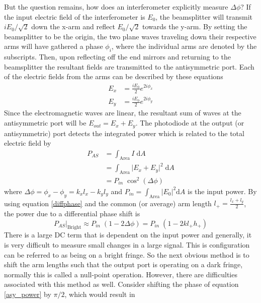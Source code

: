 		But the question remains, how does an interferometer explicitly measure $\Delta \phi$?  If the input electric field of the interferometer is $E_0$, the beamsplitter will transmit $iE_0 /\sqrt{2}$ down the x-arm and reflect $E_0 /\sqrt{2}$ towards the y-arm.  By setting the beamsplitter to be the origin, the two plane waves traveling down their respective arms will have gathered a phase $\phi_i$, where the individual arms are denoted by the subscripts. Then, upon reflecting off the end mirrors and returning to the beamsplitter the resultant fields are transmitted to the antisymmetric port. Each of the electric fields from the arms can be described by these equations
			\begin{equation}
			\begin{aligned}
				E_{x} 	&=	\frac{i E_0}{2} e^{2i\phi_{x}}	
			\\	E_{y} 	&=	\frac{i E_0}{2} e^{2i\phi_{y}}
			\end{aligned}
			\end{equation}
		Since the electromagnetic waves are linear, the resultant sum of waves at the antisymmetric port will be $E_{out} = E_x + E_y$. The photodiode at the output (or antisymmetric) port detects the integrated power which is related to the total electric field by
			\begin{equation}
			\begin{aligned}\label{asy_power}
				P_{AS}	&= \int_{\text{Area}} I \;				\text{d}A 
			\\			&= \int_{\text{Area}} \vert E_x + E_y \vert^2 \;	\text{d}A 
			\\			&= P_{in} \; \cos^2(\Delta \phi)
			\end{aligned}
			\end{equation}	
		where $\Delta \phi = \phi_{x} - \phi_{y} = k_x l_x - k_y l_y$ and $P_{in} = \int_{\text{Area}}	 \vert E_0\vert^2 \text{d}A$ is the input power. By using equation \ref{diffphase} and the common (or average) arm length $l_{+} = \frac{l_x + l_y}{2}$, the power due to a differential phase shift is
			\begin{equation}
			P_{AS}\vert_{\text{Bright}} \approx P_{in} \; (1-2 \Delta \phi) = P_{in} \; (1-2 k l_{+} h_{+})
			\end{equation}
		There is a large DC term that is dependent on the input power and generally, it is very difficult to measure small changes in a large signal.  This is configuration can be referred to as being on a bright fringe. So the next obvious method is to shift the arm lengths such that the output port is operating on a dark fringe, normally this is called a null-point operation.  However, there are difficulties associated with this method as well. Consider shifting the phase of equation \ref{asy_power} by $\pi/2$, which would result in

